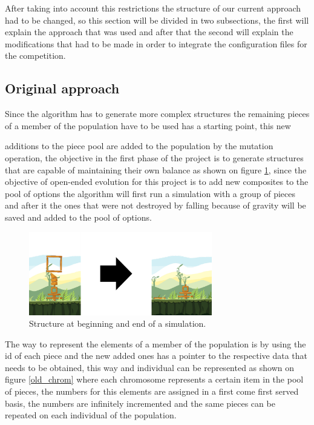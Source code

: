 \documentclass[conference]{IEEEtran}
\begin{document}
After taking into account this restrictions the structure of our current approach
had to be changed, so this section will be divided in two subsections, the first
will explain the approach that was used and after that the second will explain the
modifications that had to be made in order to integrate the configuration files
for the competition. 

\subsection{Original approach}
Since the algorithm has to generate more complex structures the remaining pieces
of a member of the population have to be used has a starting point, this new

additions to the piece pool are added to the population by the mutation
operation, the objective in the first phase of the project is to generate
structures that are capable of maintaining their own balance as shown on figure
\ref{test_old}, since the objective of open-ended evolution for this project is
to add new composites to the pool of options the algorithm will first run a
simulation with a group of pieces and after it the ones that were not destroyed
by falling because of gravity will be saved and added to the pool of options.



\begin{figure}[htbp]
\centerline{\includegraphics[width=80mm]{Images/simulation_bef_aft_example.png}}
\caption{Structure at beginning and end of a simulation.}
\label{test_old}
\end{figure}

The way to represent the elements of a member of the population is by using the
id of each piece and the new added ones has a pointer to the respective data
that needs to be obtained, this way and individual can be represented as shown
on figure \ref{old_chrom} where each chromosome represents a certain item in the
pool of pieces, the numbers for this elements are assigned in a first come first
served basis, the numbers are infinitely incremented and the same pieces can be
repeated on each individual of the population.
\end{document}
